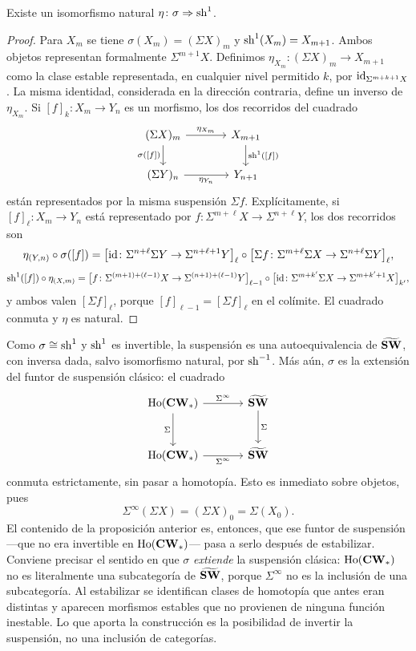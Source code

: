 \begin{prop}
Existe un isomorfismo natural $\eta\colon\sigma\Rightarrow\operatorname{sh}^1$.
\end{prop}
\begin{proof}
Para $X_m$ se tiene $\sigma(X_m)=(\Sigma X)_m$ y $\operatorname{sh}^1(X_m)=X_{m+1}$. Ambos objetos representan formalmente $\Sigma^{m+1}X$. Definimos $\eta_{X_m}\colon(\Sigma X)_m\to X_{m+1}$ como la clase estable representada, en cualquier nivel permitido $k$, por $\operatorname{id}_{\Sigma^{m+k+1}X}$. La misma identidad, considerada en la dirección contraria, define un inverso de $\eta_{X_m}$. Si $[f]_k\colon X_m\to Y_n$ es un morfismo, los dos recorridos del cuadrado
\[
\begin{tikzcd}[column sep=large]
(\Sigma X)_m \arrow[r,"{\eta_{X_m}}"] \arrow[d,"{\sigma([f])}"'] & X_{m+1} \arrow[d,"{\sh^1([f])}"]\\
(\Sigma Y)_n \arrow[r,"{\eta_{Y_n}}"'] & Y_{n+1}
\end{tikzcd}
\]
están representados por la misma suspensión $\Sigma f$. Explícitamente, si $[f]_\ell\colon X_m\to Y_n$ está representado por $f\colon\Sigma^{m+\ell}X\to\Sigma^{n+\ell}Y$, los dos recorridos son
\[
\eta_{(Y,n)}\circ\sigma([f])
=\bigl[\operatorname{id}\colon\Sigma^{n+\ell}\Sigma Y\to\Sigma^{n+\ell+1}Y\bigr]_{\ell}\circ\bigl[\Sigma f\colon\Sigma^{m+\ell}\Sigma X\to\Sigma^{n+\ell}\Sigma Y\bigr]_{\ell},
\]
\[
\operatorname{sh}^1([f])\circ\eta_{(X,m)}
=\bigl[f\colon\Sigma^{(m+1)+(\ell-1)}X\to\Sigma^{(n+1)+(\ell-1)}Y\bigr]_{\ell-1}\circ\bigl[\operatorname{id}\colon\Sigma^{m+k'}\Sigma X\to\Sigma^{m+k'+1}X\bigr]_{k'},
\]
y ambos valen $[\Sigma f]_\ell$, porque $[f]_{\ell-1}=[\Sigma f]_\ell$ en el colímite. El cuadrado conmuta y $\eta$ es natural.
\end{proof}

Como $\sigma\cong\operatorname{sh}^1$ y $\operatorname{sh}^1$ es invertible, la suspensión es una autoequivalencia de $\widetilde{\mathbf{SW}}$, con inversa dada, salvo isomorfismo natural, por $\operatorname{sh}^{-1}$. Más aún, $\sigma$ es la extensión del funtor de suspensión clásico: el cuadrado
\[
\begin{tikzcd}[column sep=large, row sep=large]
\Ho(\CWstar) \arrow[r,"{\Sigma^\infty}"] \arrow[d,"{\Sigma}"'] & \ESW \arrow[d,"{\Sigma}"]\\
\Ho(\CWstar) \arrow[r,"{\Sigma^\infty}"'] & \ESW
\end{tikzcd}
\]
conmuta estrictamente, sin pasar a homotopía. Esto es inmediato sobre objetos, pues
\[
\Sigma^\infty(\Sigma X)=(\Sigma X)_0=\Sigma(X_0).
\]
 El contenido de la proposición anterior es, entonces, que ese funtor de suspensión ---que no era invertible en $\operatorname{Ho}(\mathbf{CW}_*)$--- pasa a serlo después de estabilizar. Conviene precisar el sentido en que $\sigma$ \emph{extiende} la suspensión clásica: $\operatorname{Ho}(\mathbf{CW}_*)$ no es literalmente una subcategoría de $\widetilde{\mathbf{SW}}$, porque $\Sigma^\infty$ no es la inclusión de una subcategoría. Al estabilizar se identifican clases de homotopía que antes eran distintas y aparecen morfismos estables que no provienen de ninguna función inestable. Lo que aporta la construcción es la posibilidad de invertir la suspensión, no una inclusión de categorías.

